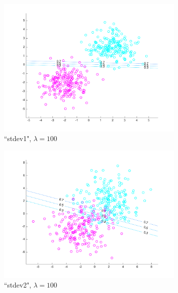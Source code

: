\begin{figure}[h!]
\centering
    \begin{subfigure}[b]{0.22\textwidth}
	\includegraphics[scale=0.25]{hw2_1_stdev1_a_100.pdf}
	\caption{``stdev1", $\lambda = 100$}\label{fig:data_stdev1_a_100}
    \end{subfigure}
    \quad
    \begin{subfigure}[b]{0.22\textwidth}
	\includegraphics[scale=0.25]{hw2_1_stdev2_a_100.pdf}
	\caption{``stdev2", $\lambda = 100$}\label{fig:data_stdev2_a_100}
	\end{subfigure}
	\quad	    
    \begin{subfigure}[b]{0.22\textwidth}

\end{subfigure}
\end{figure}

